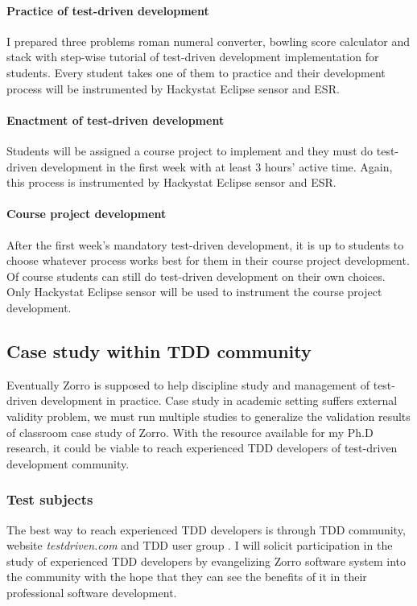 \paragraph{Practice of test-driven development}
I prepared three problems roman numeral converter, bowling score calculator
and stack with step-wise tutorial of test-driven development implementation
for students. Every student takes one of them to practice and their
development process will be instrumented by Hackystat Eclipse sensor and
ESR.

\paragraph{Enactment of test-driven development}
Students will be assigned a course project to implement and they must do
test-driven development in the first week with at least 3 hours' active
time. Again, this process is instrumented by Hackystat Eclipse sensor and
ESR.

\paragraph{Course project development}
After the first week's mandatory test-driven development, it is up to
students to choose whatever process works best for them in their course
project development. Of course students can still do test-driven
development on their own choices. Only Hackystat Eclipse sensor will be
used to instrument the course project development. 

\subsection{Case study within TDD community}
Eventually Zorro is supposed to help discipline study and management of
test-driven development in practice. Case study in academic setting suffers
external validity problem, we must run multiple studies\cite{Yin:03} to
generalize the validation results of classroom case study of Zorro. With
the resource available for my Ph.D research, it could be viable to reach
experienced TDD developers of test-driven development community.

\subsubsection{Test subjects}
The best way to reach experienced TDD developers is through TDD community,
website \textit{testdriven.com} and TDD user group \cite{TddYahooGroup}. I
will solicit participation in the study of experienced TDD developers by
evangelizing Zorro software system into the community with the hope that
they can see the benefits of it in their professional software development.

